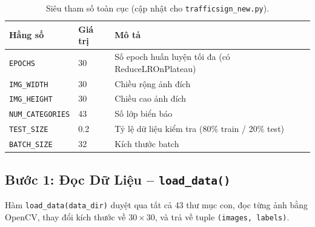 \documentclass[12pt,a4paper]{article}
\begin{document}
\begin{table}[H]
\centering
\begin{tabular}{@{}lll@{}}
\toprule
\textbf{Hằng số} & \textbf{Giá trị} & \textbf{Mô tả} \\ \midrule
\texttt{EPOCHS}         & 30    & Số epoch huấn luyện tối đa (có ReduceLROnPlateau) \\
\texttt{IMG\_WIDTH}     & 30 & Chiều rộng ảnh đích \\
\texttt{IMG\_HEIGHT}    & 30 & Chiều cao ảnh đích \\
\texttt{NUM\_CATEGORIES}& 43    & Số lớp biển báo \\
\texttt{TEST\_SIZE}     & 0.2   & Tỷ lệ dữ liệu kiểm tra (80\% train / 20\% test) \\
\texttt{BATCH\_SIZE}    & 32    & Kích thước batch \\ \bottomrule
\end{tabular}
\caption{Siêu tham số toàn cục (cập nhật cho \texttt{trafficsign\_new.py}).}
\label{tab:hyperparams}
\end{table}

\subsection{Bước 1: Đọc Dữ Liệu -- \texttt{load\_data()}}

Hàm \texttt{load\_data(data\_dir)} duyệt qua tất cả 43 thư mục con, đọc từng ảnh bằng OpenCV, thay đổi kích thước về $30 \times 30$, và trả về tuple \texttt{(images, labels)}.
\end{document}
